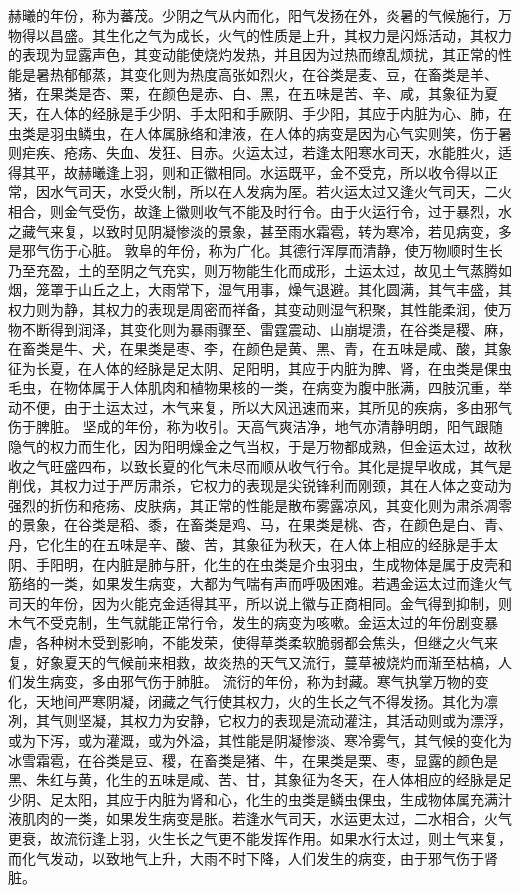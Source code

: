 \documentclass[a4paper,12pt,UTF8,twoside]{ctexbook}
\begin{document}
赫曦的年份，称为蕃茂。少阴之气从内而化，阳气发扬在外，炎暑的气候施行，万物得以昌盛。其生化之气为成长，火气的性质是上升，其权力是闪烁活动，其权力的表现为显露声色，其变动能使烧灼发热，并且因为过热而缭乱烦扰，其正常的性能是暑热郁郁蒸，其变化则为热度高张如烈火，在谷类是麦、豆，在畜类是羊、猪，在果类是杏、栗，在颜色是赤、白、黑，在五味是苦、辛、咸，其象征为夏天，在人体的经脉是手少阴、手太阳和手厥阴、手少阳，其应于内脏为心、肺，在虫类是羽虫鳞虫，在人体属脉络和津液，在人体的病变是因为心气实则笑，伤于暑则疟疾、疮疡、失血、发狂、目赤。火运太过，若逢太阳寒水司天，水能胜火，适得其平，故赫曦逢上羽，则和正徽相同。水运既平，金不受克，所以收令得以正常，因水气司天，水受火制，所以在人发病为厔。若火运太过又逢火气司天，二火相合，则金气受伤，故逢上徽则收气不能及时行令。由于火运行令，过于暴烈，水之藏气来复，以致时见阴凝惨淡的景象，甚至雨水霜雹，转为寒冷，若见病变，多是邪气伤于心脏。
敦阜的年份，称为广化。其德行浑厚而清静，使万物顺时生长乃至充盈，土的至阴之气充实，则万物能生化而成形，土运太过，故见土气蒸腾如烟，笼罩于山丘之上，大雨常下，湿气用事，燥气退避。其化圆满，其气丰盛，其权力则为静，其权力的表现是周密而祥备，其变动则湿气积聚，其性能柔润，使万物不断得到润泽，其变化则为暴雨骤至、雷霆震动、山崩堤溃，在谷类是稷、麻，在畜类是牛、犬，在果类是枣、李，在颜色是黄、黑、青，在五味是咸、酸，其象征为长夏，在人体的经脉是足太阴、足阳明，其应于内脏为脾、肾，在虫类是倮虫毛虫，在物体属于人体肌肉和植物果核的一类，在病变为腹中胀满，四肢沉重，举动不便，由于土运太过，木气来复，所以大风迅速而来，其所见的疾病，多由邪气伤于脾脏。
坚成的年份，称为收引。天高气爽洁净，地气亦清静明朗，阳气跟随隐气的权力而生化，因为阳明燥金之气当权，于是万物都成熟，但金运太过，故秋收之气旺盛四布，以致长夏的化气未尽而顺从收气行令。其化是提早收成，其气是削伐，其权力过于严厉肃杀，它权力的表现是尖锐锋利而刚颈，其在人体之变动为强烈的折伤和疮疡、皮肤病，其正常的性能是散布雾露凉风，其变化则为肃杀凋零的景象，在谷类是稻、黍，在畜类是鸡、马，在果类是桃、杏，在颜色是白、青、丹，它化生的在五味是辛、酸、苦，其象征为秋天，在人体上相应的经脉是手太阴、手阳明，在内脏是肺与肝，化生的在虫类是介虫羽虫，生成物体是属于皮壳和筋络的一类，如果发生病变，大都为气喘有声而呼吸困难。若遇金运太过而逢火气司天的年份，因为火能克金适得其平，所以说上徽与正商相同。金气得到抑制，则木气不受克制，生气就能正常行令，发生的病变为咳嗽。金运太过的年份剧变暴虐，各种树木受到影响，不能发荣，使得草类柔软脆弱都会焦头，但继之火气来复，好象夏天的气候前来相救，故炎热的天气又流行，蔓草被烧灼而渐至枯槁，人们发生病变，多由邪气伤于肺脏。
流衍的年份，称为封藏。寒气执掌万物的变化，天地间严寒阴凝，闭藏之气行使其权力，火的生长之气不得发扬。其化为凛冽，其气则坚凝，其权力为安静，它权力的表现是流动灌注，其活动则或为漂浮，或为下泻，或为灌溉，或为外溢，其性能是阴凝惨淡、寒冷雾气，其气候的变化为冰雪霜雹，在谷类是豆、稷，在畜类是猪、牛，在果类是栗、枣，显露的颜色是黑、朱红与黄，化生的五味是咸、苦、甘，其象征为冬天，在人体相应的经脉是足少阴、足太阳，其应于内脏为肾和心，化生的虫类是鳞虫倮虫，生成物体属充满汁液肌肉的一类，如果发生病变是胀。若逢水气司天，水运更太过，二水相合，火气更衰，故流衍逢上羽，火生长之气更不能发挥作用。如果水行太过，则土气来复，而化气发动，以致地气上升，大雨不时下降，人们发生的病变，由于邪气伤于肾脏。
\end{document}
